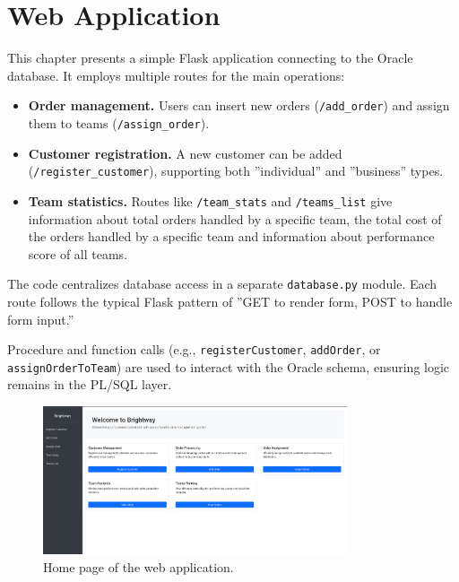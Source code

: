 
\chapter{Web Application}

This chapter presents a simple Flask application connecting to the Oracle database. 
It employs multiple routes for the main operations:

\begin{itemize}
    \item \textbf{Order management.} Users can insert new orders (\texttt{/add\_order}) 
    and assign them to teams (\texttt{/assign\_order}).
    \item \textbf{Customer registration.} A new customer can be added (\texttt{/register\_customer}), 
    supporting both ''individual'' and ''business'' types.
    \item \textbf{Team statistics.} Routes like \texttt{/team\_stats} and \texttt{/teams\_list} 
    give information about total orders handled by a specific team, the total cost of the orders handled by a specific team and information about performance score of all teams.
\end{itemize}

The code centralizes database access in a separate \texttt{database.py} module. 
Each route follows the typical Flask pattern of ''GET to render form, POST to handle form input.'' 

Procedure and function calls (e.g., \texttt{registerCustomer}, \texttt{addOrder}, or \texttt{assignOrderToTeam}) are used to interact with the Oracle schema, ensuring logic remains in the PL/SQL layer.

\begin{figure}[H]
    \centering
    \includegraphics[width=0.8\textwidth]{img/web_app/home.png}
    \caption{Home page of the web application.}
\end{figure}

